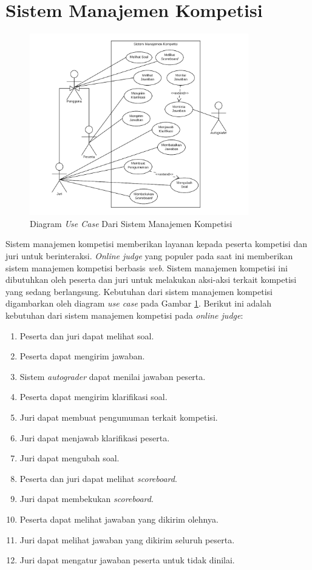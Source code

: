 \section{Sistem Manajemen Kompetisi}

\begin{figure}[ht!]
    \centering
    \includegraphics[width=0.85\textwidth]{images/oj-use-case}
    \caption{Diagram \textit{Use Case} Dari Sistem Manajemen Kompetisi}
    \label{fig:oj-use-case}
\end{figure}

\par Sistem manajemen kompetisi memberikan layanan kepada peserta kompetisi dan juri untuk berinteraksi. \textit{Online judge} yang populer pada saat ini memberikan sistem manajemen kompetisi berbasis \textit{web}. Sistem manajemen kompetisi ini dibutuhkan oleh peserta dan juri untuk melakukan aksi-aksi terkait kompetisi yang sedang berlangsung. Kebutuhan dari sistem manajemen kompetisi digambarkan oleh diagram \textit{use case} pada Gambar \ref{fig:oj-use-case}. Berikut ini adalah kebutuhan dari sistem manajemen kompetisi pada \textit{online judge}:

\begin{enumerate}
    \item Peserta dan juri dapat melihat soal.
    \item Peserta dapat mengirim jawaban.
    \item Sistem \textit{autograder} dapat menilai jawaban peserta.
    \item Peserta dapat mengirim klarifikasi soal.
    \item Juri dapat membuat pengumuman terkait kompetisi.
    \item Juri dapat menjawab klarifikasi peserta.
    \item Juri dapat mengubah soal.
    \item Peserta dan juri dapat melihat \textit{scoreboard}.
    \item Juri dapat membekukan \textit{scoreboard}.
    \item Peserta dapat melihat jawaban yang dikirim olehnya.
    \item Juri dapat melihat jawaban yang dikirim seluruh peserta.
    \item Juri dapat mengatur jawaban peserta untuk tidak dinilai.
\end{enumerate}

